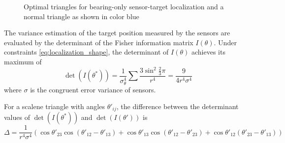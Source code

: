 \documentclass[times]{rncauth}
\begin{document}
\begin{figure}
\caption{Optimal triangles for bearing-only sensor-target
localization and a normal triangle as shown in color
blue}\label{fig:optimal_triangles}
\end{figure}



The variance estimation of the  target position measured by the
sensors are evaluated by the determinant of the Fisher information
matrix $I(\theta)$. Under constraints \eqref{eq:localization_shape},
the determinant of $I(\theta)$ achieves its maximum
of\cite{Bishop10sensor}
\begin{equation}
  \det(I(\theta^*))=\frac{1}{\sigma_\theta^4}\sum\frac{3\sin^2
  \frac{2}{3}\pi}{r^4}=\frac{9}{4r^4\sigma^4}
\end{equation}
where $\sigma$ is the congruent error variance of sensors.

For a scalene triangle with angles $\theta'_{ij}$, the difference
between the determinant values of $\det(I(\theta^*))$ and
$\det(I(\theta'))$ is
\begin{equation}
  \Delta=\frac{1}{r^4\sigma^4}(\cos \theta'_{23}\cos(\theta'_{12}-\theta'_{13})+
  \cos \theta'_{13}\cos(\theta'_{12}-\theta'_{23})+ \cos \theta'_{12}(\theta'_{23}-\theta'_{13}))
\end{equation}
\end{document}
